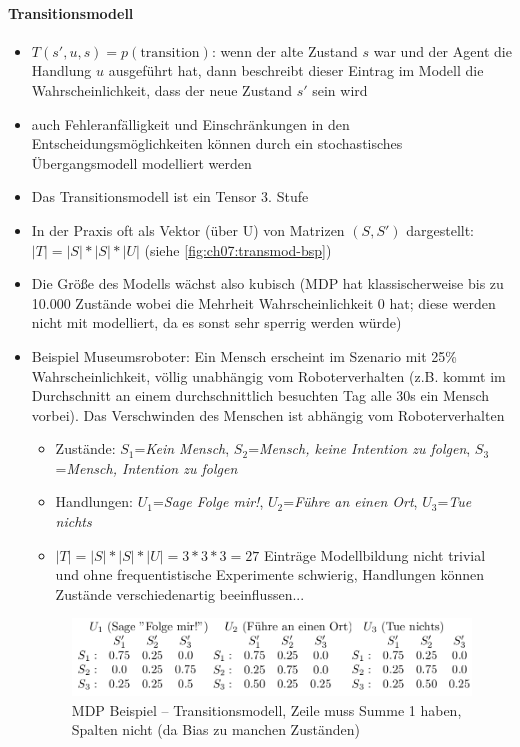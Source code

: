 \paragraph{Transitionsmodell}
\begin{itemize}
	\item $T(s', u, s) = p(\text{transition})$: wenn der alte Zustand $s$ war und der Agent die Handlung $u$ ausgef\"uhrt hat, dann beschreibt dieser Eintrag im Modell die Wahrscheinlichkeit, dass 			der neue Zustand $s'$ sein wird
	\item auch Fehleranfälligkeit und Einschränkungen in den Entscheidungsmöglichkeiten können durch ein stochastisches Übergangsmodell modelliert werden
	\item Das Transitionsmodell ist ein Tensor 3. Stufe
	\item In der Praxis oft als Vektor (\"uber U) von Matrizen $(S, S')$ dargestellt: $|T| = |S| * |S| * |U|$ (siehe \autoref{fig:ch07:transmod-bsp})
	\item Die Gr\"o{\ss}e des Modells w\"achst also kubisch (MDP hat klassischerweise bis zu 10.000 Zustände wobei die Mehrheit Wahrscheinlichkeit 0 hat; diese werden nicht mit modelliert, da es 				sonst sehr sperrig werden würde)
	\item Beispiel Museumsroboter: Ein Mensch erscheint im Szenario mit 25\% Wahrscheinlichkeit, völlig unabhängig vom Roboterverhalten (z.B. kommt im Durchschnitt an einem durchschnittlich besuchten  		Tag alle 30s ein Mensch vorbei). Das Verschwinden des Menschen ist abhängig vom Roboterverhalten
	\begin{itemize}
		\item Zustände: $S_1$=\textit{Kein Mensch}, $S_2$=\textit{Mensch, keine Intention zu folgen}, $S_3$=\textit{Mensch, Intention zu folgen} 
		\item Handlungen: $U_1$=\textit{Sage \glqq Folge mir!\grqq}, $U_2$=\textit{Führe an einen Ort}, $U_3$=\textit{Tue nichts}
		\item $|T| = |S| * |S| * |U| = 3*3*3=27$ Einträge
		\ita Modellbildung nicht trivial und ohne frequentistische Experimente schwierig, Handlungen können Zustände verschiedenartig beeinflussen...
	\end{itemize}
	\begin{figure}[!h]
		\centering
  		\includegraphics[width=0.6\linewidth]{figures/ch07_transmod-bsp.png}
		\caption{MDP Beispiel -- Transitionsmodell, Zeile muss Summe 1 haben, Spalten nicht (da Bias zu manchen Zuständen)}
		\label{fig:ch07:transmod-bsp}
	\end{figure}
\end{itemize}

